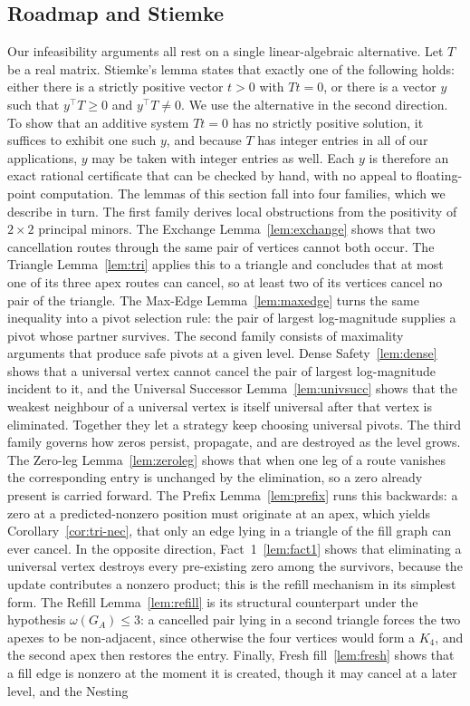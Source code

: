 \documentclass[11pt]{article}
\theoremstyle{plain}
\theoremstyle{definition}
\begin{document}
\subsection{Roadmap and Stiemke}
\label{sec:roadmap}
\begin{humanblock}
Our infeasibility arguments all rest on a single linear-algebraic alternative. Let $T$ be a real matrix. Stiemke's lemma \cite{Stiemke,Gordan} states that exactly one of the following holds: either there is a strictly positive vector $t>0$ with $Tt=0$, or there is a vector $y$ such that $y^\top T\ge0$ and $y^\top T\neq0$. We use the alternative in the second direction. To show that an additive system $Tt=0$ has no strictly positive solution, it suffices to exhibit one such $y$, and because $T$ has integer entries in all of our applications, $y$ may be taken with integer entries as well. Each $y$ is therefore an exact rational certificate that can be checked by hand, with no appeal to floating-point computation. The lemmas of this section fall into four families, which we describe in turn. The first family derives local obstructions from the positivity of $2\times2$ principal minors. The Exchange Lemma~\ref{lem:exchange} shows that two cancellation routes through the same pair of vertices cannot both occur. The Triangle Lemma~\ref{lem:tri} applies this to a triangle and concludes that at most one of its three apex routes can cancel, so at least two of its vertices cancel no pair of the triangle. The Max-Edge Lemma~\ref{lem:maxedge} turns the same inequality into a pivot selection rule: the pair of largest log-magnitude supplies a pivot whose partner survives. The second family consists of maximality arguments that produce safe pivots at a given level. Dense Safety~\ref{lem:dense} shows that a universal vertex cannot cancel the pair of largest log-magnitude incident to it, and the Universal Successor Lemma~\ref{lem:univsucc} shows that the weakest neighbour of a universal vertex is itself universal after that vertex is eliminated. Together they let a strategy keep choosing universal pivots. The third family governs how zeros persist, propagate, and are destroyed as the level grows. The Zero-leg Lemma~\ref{lem:zeroleg} shows that when one leg of a route vanishes the corresponding entry is unchanged by the elimination, so a zero already present is carried forward. The Prefix Lemma~\ref{lem:prefix} runs this backwards: a zero at a predicted-nonzero position must originate at an apex, which yields Corollary~\ref{cor:tri-nec}, that only an edge lying in a triangle of the fill graph can ever cancel. In the opposite direction, Fact~1~\ref{lem:fact1} shows that eliminating a universal vertex destroys every pre-existing zero among the survivors, because the update contributes a nonzero product; this is the refill mechanism in its simplest form. The Refill Lemma~\ref{lem:refill} is its structural counterpart under the hypothesis $\omega(G_A)\le3$: a cancelled pair lying in a second triangle forces the two apexes to be non-adjacent, since otherwise the four vertices would form a $K_4$, and the second apex then restores the entry. Finally, Fresh fill~\ref{lem:fresh} shows that a fill edge is nonzero at the moment it is created, though it may cancel at a later level, and the Nesting 
\end{humanblock}
\end{document}
